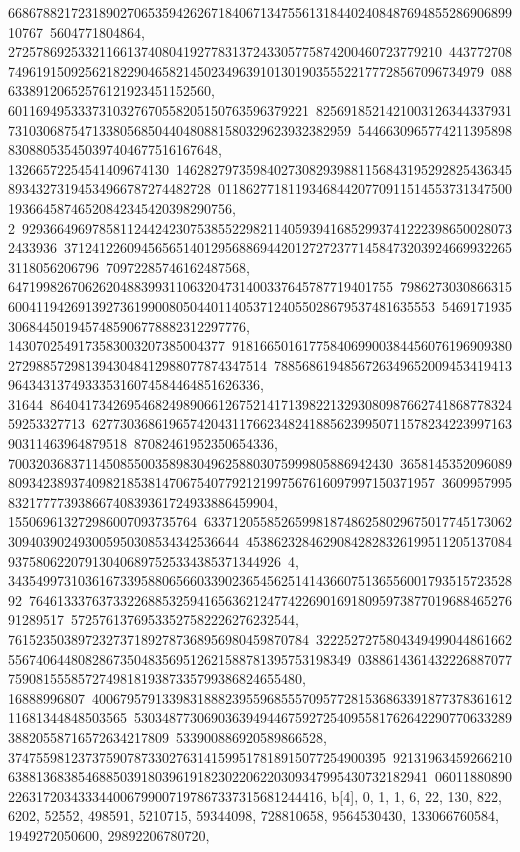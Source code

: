{{{66867882172318902706535942626718406713475561318440240848769485528690689910767\
5604771804864, 27257869253321166137408041927783137243305775874200460723779210\
44377270874961915092562182290465821450234963910130190355522177728567096734979\
08863389120652576121923451152560, 6011694953337310327670558205150763596379221\
82569185214210031263443379317310306875471338056850440480881580329623932382959\
5446630965774211395898830880535450397404677516167648, 13266572254541409674130\
14628279735984027308293988115684319529282543634589343273194534966787274482728\
01186277181193468442077091151455373134750019366458746520842345420398290756, 2\
92936649697858112442423075385522982114059394168529937412223986500280732433936\
37124122609456565140129568869442012727237714584732039246699322653118056206796\
70972285746162487568, 6471998267062620488399311063204731400337645787719401755\
79862730308663156004119426913927361990080504401140537124055028679537481635553\
54691719353068445019457485906778882312297776, 1430702549173583003207385004377\
91816650161775840699003844560761969093802729885729813943048412988077874347514\
7885686194856726349652009453419413964343137493335316074584464851626336, 31644\
86404173426954682498906612675214171398221329308098766274186877832459253327713\
62773036861965742043117662348241885623995071157823422399716390311463964879518\
87082461952350654336, 7003203683711450855003589830496258803075999805886942430\
36581453520960898093423893740982185381470675407792121997567616097997150371957\
360995799583217777393866740839361724933886459904, 155069613272986007093735764\
63371205585265998187486258029675017745173062309403902493005950308534342536644\
45386232846290842828326199511205137084937580622079130406897525334385371344926\
4, 34354997310361673395880656603390236545625141436607513655600179351572352892\
76461333763733226885325941656362124774226901691809597387701968846527691289517\
57257613769533527582226276232544, 7615235038972327371892787368956980459870784\
32225272758043494990448616625567406448082867350483569512621588781395753198349\
0388614361432226887077759081555857274981819387335799386824655480, 16888996807\
40067957913398318882395596855570957728153686339187737836161211681344848503565\
53034877306903639494467592725409558176264229077063328938820558716572634217809\
533900886920589866528, 374755981237375907873302763141599517818915077254900395\
92131963459266210638813683854688503918039619182302206220309347995430732182941\
06011880890226317203433344006799007197867337315681244416}}, 
 {b[4], {0, 1, 1, 6, 22, 130, 822, 6202, 52552, 498591, 5210715, 59344098, 
   728810658, 9564530430, 133066760584, 1949272050600, 29892206780720, 
}}}
